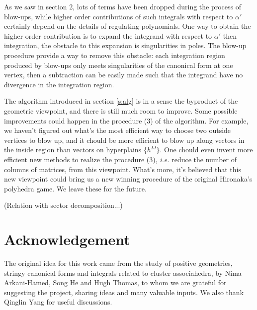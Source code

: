 \documentclass[12pt]{article}
\theoremstyle{definition}
\theoremstyle{plain}
\newcommand{\dif}{\mathrm{d}} %
\begin{document}
As we saw in section 2, lots of terms have been dropped during the process of blow-ups, while higher order contributions of such integrals with respect to $\alpha'$ certainly depend on the details of regulating polynomials. One way to obtain the higher order contribution is to expand the integrand with respect to $\alpha'$ then integration, the obstacle to this expansion is singularities in poles. The blow-up procedure provide a way to remove this obstacle: each integration region produced by blow-ups only meets singularities of the canonical form at one vertex, then a subtraction can be easily made such that the integrand have no divergence in the integration region.

The algorithm introduced in section \ref{s:alg} is in a sense 
the byproduct of the geometric viewpoint, and there is still much room to improve.
Some possible improvements could happen in the procedure (3) of the algorithm. 
For example, we haven't figured out what's the most efficient way to choose 
two outside vertices to blow up, 
and it chould be more efficient to blow up along vectors in the inside region than
vectors on hyperplains $\{h^{IJ}\}$. One chould even invent more efficient new methods 
to realize the procedure (3), \textit{i.e.} reduce the number of columns of matrices, 
from this viewpoint. What's more, it's believed that this new viewpoint could bring
us a new winning procedure of the original Hironaka's polyhedra game. 
We leave these for the future.

(Relation with sector decomposition...)

\section*{Acknowledgement}
The original idea for this work came from the study of positive geometries, 
stringy canonical forms and integrals related to cluster associahedra,
by Nima Arkani-Hamed, Song He and Hugh Thomas, to whom we are grateful 
for suggesting the project, sharing ideas and many valuable inputs. 
We also thank Qinglin Yang for useful discussions.


\end{document}

